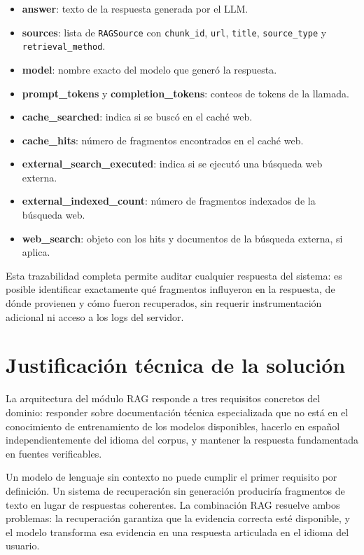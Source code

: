 \documentclass[11pt]{article}
\begin{document}
\begin{itemize}
\item \textbf{answer}: texto de la respuesta generada por el LLM.
\item \textbf{sources}: lista de \texttt{RAGSource} con \texttt{chunk\_id}, \texttt{url},
      \texttt{title}, \texttt{source\_type} y \texttt{retrieval\_method}.
\item \textbf{model}: nombre exacto del modelo que generó la respuesta.
\item \textbf{prompt\_tokens} y \textbf{completion\_tokens}: conteos de tokens de la llamada.
\item \textbf{cache\_searched}: indica si se buscó en el caché web.
\item \textbf{cache\_hits}: número de fragmentos encontrados en el caché web.
\item \textbf{external\_search\_executed}: indica si se ejecutó una búsqueda web externa.
\item \textbf{external\_indexed\_count}: número de fragmentos indexados de la búsqueda web.
\item \textbf{web\_search}: objeto con los hits y documentos de la búsqueda externa, si aplica.
\end{itemize}

Esta trazabilidad completa permite auditar cualquier respuesta del sistema: es posible
identificar exactamente qué fragmentos influyeron en la respuesta, de dónde provienen y cómo
fueron recuperados, sin requerir instrumentación adicional ni acceso a los logs del servidor.

\section{Justificación técnica de la solución}

La arquitectura del módulo RAG responde a tres requisitos concretos del dominio: responder
sobre documentación técnica especializada que no está en el conocimiento de entrenamiento de
los modelos disponibles, hacerlo en español independientemente del idioma del corpus, y
mantener la respuesta fundamentada en fuentes verificables.

Un modelo de lenguaje sin contexto no puede cumplir el primer requisito por definición. Un
sistema de recuperación sin generación produciría fragmentos de texto en lugar de respuestas
coherentes. La combinación RAG resuelve ambos problemas: la recuperación garantiza que la
evidencia correcta esté disponible, y el modelo transforma esa evidencia en una respuesta
articulada en el idioma del usuario.
\end{document}
